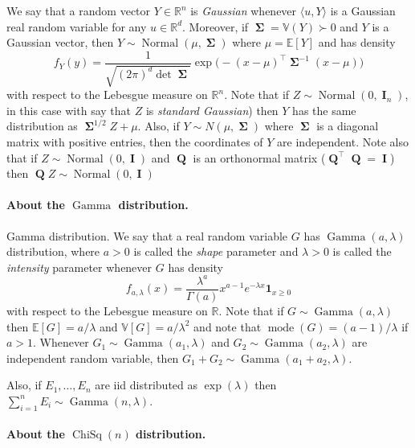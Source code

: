\documentclass[
	fontsize=11pt, %
	twoside=false, %
	numbers=noenddot, %
]{kaobook}
\DeclareMathOperator{\bI}{\boldsymbol I}
\DeclareMathOperator{\bQ}{\boldsymbol Q}
\DeclareMathOperator{\bSigma}{\boldsymbol \Sigma}
\DeclareMathOperator{\mode}{mode}
\DeclareMathOperator{\chisq}{ChiSq}
\DeclareMathOperator{\gam}{Gamma}
\DeclareMathOperator{\nor}{Normal}
\newcommand{\E}{\mathbb E}
\newcommand{\R}{\mathbb R}
\newcommand{\var}{\mathbb V}
\newcommand{\ind}[1]{\mathbf 1_{#1}}
\newcommand{\inr}[1]{\langle #1 \rangle}
\begin{document}
We say that a random vector $Y \in \R^n$ is \emph{Gaussian} whenever $\inr{u, Y}$ is a Gaussian real random variable for any $u \in \R^d$.
Moreover, if $\bSigma = \var(Y) \succ 0$ and $Y$ is a Gaussian vector, then $Y \sim \nor(\mu, \bSigma)$ where $\mu = \E[Y]$ and has density
\begin{equation*}
	f_Y(y) = \frac{1}{\sqrt{(2 \pi)^d \det \bSigma}} \exp \Big( - (x - \mu)^\top \bSigma^{-1} (x - \mu) \Big)
\end{equation*}
with respect to the Lebesgue measure on $\R^n$.
Note that if $Z \sim \nor(0, \bI_n)$, in this case with say that $Z$ is \emph{standard Gaussian}) then $Y$ has the same distribution as $\bSigma^{1/2} Z + \mu$.
Also, if $Y \sim N(\mu, \bSigma)$ where $\bSigma$ is a diagonal matrix with positive entries, then the coordinates of $Y$ are independent.
Note also that if $Z \sim \nor(0, \bI)$ and $\bQ$ is an orthonormal matrix ($\bQ^\top \bQ = \bI$) then $\bQ Z \sim \nor(0, \bI)$

\paragraph{About the $\gam$ distribution.} %

Gamma distribution. We say that a real random variable $G$ has $\gam(a, \lambda)$ distribution, where $a > 0$ is called the \emph{shape} parameter and $\lambda > 0$ is called the \emph{intensity} parameter whenever $G$ has density
\begin{equation*}
	f_{a, \lambda}(x) = \frac{\lambda^a}{\Gamma(a)} x^{a - 1} e^{-\lambda x} \ind{x \geq 0}
\end{equation*}
with respect to the Lebesgue measure on $\R$.
Note that if $G \sim \gam(a, \lambda)$ then $\E[G] = a / \lambda$ and $\var[G] = a / \lambda^2$ and note that $\mode(G) = (a - 1) / \lambda$ if $a > 1$.
Whenever $G_1 \sim \gam(a_1, \lambda)$ and $G_2 \sim \gam(a_2, \lambda)$ are independent random variable, then $G_1 + G_2 \sim \gam(a_1 + a_2, \lambda)$. 

Also, if $E_1, \ldots, E_n$ are iid distributed as $\exp(\lambda)$ then $\sum_{i=1}^n E_i \sim \gam(n, \lambda)$.

\paragraph{About the $\chisq(n)$ distribution.} %
\end{document}
